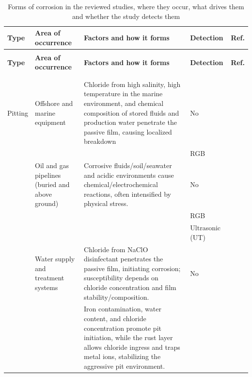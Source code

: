 {\scriptsize
\renewcommand{\arraystretch}{1.15}
\setlength{\tabcolsep}{3pt}
\begin{xltabular}{\textwidth}{>{\RaggedRight\arraybackslash}p{1.5cm}>{\RaggedRight\arraybackslash}p{2.6cm}>{\RaggedRight\arraybackslash}X>{\RaggedRight\arraybackslash}p{2.4cm}>{\RaggedRight\arraybackslash}p{1.9cm}}
\caption{Forms of corrosion in the reviewed studies, where they occur, what drives them and whether the study detects them}\label{tab:corrosion}\\
\toprule
\textbf{Type} & \textbf{Area of occurrence} & \textbf{Factors and how it forms} & \textbf{Detection} & \textbf{Ref.} \\
\midrule
\endfirsthead
{}\\
\toprule
\textbf{Type} & \textbf{Area of occurrence} & \textbf{Factors and how it forms} & \textbf{Detection} & \textbf{Ref.} \\
\midrule
\endhead
\midrule{}\\
\endfoot
\bottomrule
{}\\
\endlastfoot
Pitting & Offshore and marine equipment & Chloride from high salinity, high temperature in the marine environment, and chemical composition of stored fluids and production water penetrate the passive film, causing localized breakdown & No & \citep{Liu2026,Wang2021,Khodabux2021,Nugroho2021} \\
 &  &  & RGB & \citep{Mao2026} \\
 & Oil and gas pipelines (buried and above ground) & Corrosive fluids/soil/seawater and acidic environments cause chemical/electrochemical reactions, often intensified by physical stress. & No & \citep{Arzaghi2020,Akhlaghi2023} \\
 &  &  & RGB & \citep{Malashin2024} \\
 &  &  & Ultrasonic (UT) & \citep{Huang2026a} \\
 & Water supply and treatment systems & Chloride from NaClO disinfectant penetrates the passive film, initiating corrosion; susceptibility depends on chloride concentration and film stability/composition. & No & \citep{Li2022,Nguyen2026} \\
 &  & Iron contamination, water content, and chloride concentration promote pit initiation, while the rust layer allows chloride ingress and traps metal ions, stabilizing the aggressive pit environment. &  &  \\

\end{xltabular}}
